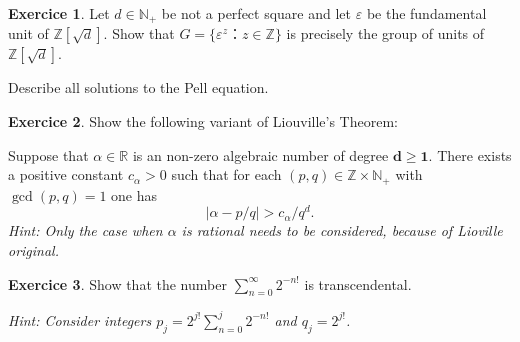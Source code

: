\documentclass[12pt,a4paper]{article}
\theoremstyle{plain}
\newtheorem*{Sol*}{Solution}
\theoremstyle{definition}
\newtheorem{Ex}{Exercice}
\newif\ifsolutions
\newcommand{\exercise}[2]{
			\begin{Ex} #1 \end{Ex}
			\ifsolutions  \begin{Sol*} #2 \end{Sol*} \bigskip \else \bigskip  \fi
		}
\begin{document}
\exercise{ Let $d ∈ ℕ_+$ be not a perfect square and let $ε$ be the fundamental unit of $ℤ[\sqrt{d}]$. Show that $G = \{ ε ^z ： z ∈ℤ\}$  is precisely the group of units of $ℤ[\sqrt{d}]$.

  \bigskip
  
  \noindent
  Describe all solutions to the Pell equation. 
}{}



\exercise{
  Show the following variant of Liouville's Theorem:

  \bigskip 
  
  \noindent  
    Suppose that $α∈ ℝ$ is an non-zero algebraic number of degree $\mathbf{d ≥1}$. There exists a positive constant $c_α>0$ such that for each $(p,q) ∈ ℤ×ℕ_+$ with $\gcd(p,q) = 1$ one has
  \begin{displaymath}
    |α - p/q| > c_α/q^d. 
  \end{displaymath}
\smallskip 
\noindent 
\emph{Hint: Only the case when $α$ is rational needs to be considered, because of Lioville original.}
}{}


\exercise{Show that the number $∑_{n=0}^{∞} 2^{-n!}$ is transcendental.

  \bigskip

\emph{Hint:   Consider integers  $p_j = 2^{j!} ∑_{n=0}^j 2^{-n!}$ and $q_j = 2^{j!}$. }
  
}{}
  
\end{document}
